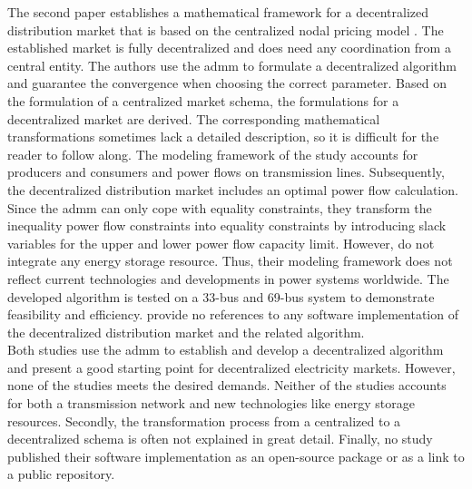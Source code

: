 The second paper establishes a mathematical framework for a decentralized distribution market that is based on the centralized nodal pricing model \citep{yang2019}. The established market is fully decentralized and does need any coordination from a central entity. The authors use the \gls{admm} to formulate a decentralized algorithm and guarantee the convergence when choosing the correct parameter. Based on the formulation of a centralized market schema, the formulations for a decentralized market are derived. The corresponding mathematical transformations sometimes lack a detailed description, so it is difficult for the reader to follow along. The modeling framework of the study accounts for producers and consumers and power flows on transmission lines. Subsequently, the decentralized distribution market includes an optimal power flow calculation. Since the \gls{admm} can only cope with equality constraints, they transform the inequality power flow constraints into equality constraints by introducing slack variables for the upper and lower power flow capacity limit. However, \citet{yang2019} do not integrate any energy storage resource. Thus, their modeling framework does not reflect current technologies and developments in power systems worldwide. The developed algorithm is tested on a 33-bus and 69-bus system to demonstrate feasibility and efficiency. \citet{yang2019} provide no references to any software implementation of the decentralized distribution market and the related algorithm. \\

Both studies use the \gls{admm} to establish and develop a decentralized algorithm and present a good starting point for decentralized electricity markets. However, none of the studies meets the desired demands. Neither of the studies accounts for both a transmission network and new technologies like energy storage resources. Secondly, the transformation process from a centralized to a decentralized schema is often not explained in great detail. Finally, no study published their software implementation as an open-source package or as a link to a public repository. 

